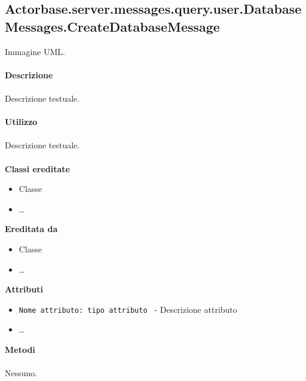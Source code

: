 \documentclass[a4paper]{article}
\begin{document}
	\subsection{Actorbase.server.messages.query.user.DatabaseMessages.CreateDatabaseMessage}
		Immagine UML.
		\\ \\
		\textbf{Descrizione}
			\\ \\
			Descrizione testuale.
			\\ \\
		\textbf{Utilizzo}
			\\ \\
			Descrizione testuale.
			\\ \\
		\textbf{Classi ereditate}
			\begin{itemize}
				\item Classe
				\item \dots
			\end{itemize}
		\textbf{Ereditata da}
			\begin{itemize}
				\item Classe
				\item \dots
			\end{itemize}
		\textbf{Attributi}
			\begin{itemize}
				\item \texttt{Nome attributo: tipo attributo } - Descrizione attributo
				\item \dots
			\end{itemize}
		\textbf{Metodi}
			\\ \\
			Nessuno.		
			
\end{document}
